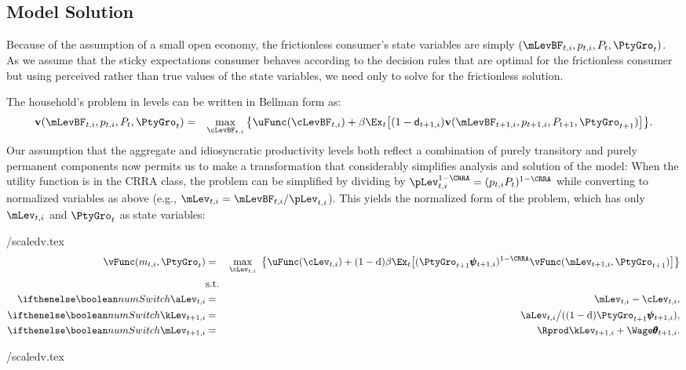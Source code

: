 \documentclass[titlepage]{\econtex}
\let\footnote=\endnote
\begin{document}
\subsection{Model Solution}

Because of the assumption of a small open economy, the frictionless consumer's state variables are simply $(\mLevBF_{t,i},p_{t,i},P_t,\PtyGro_t)$.  As we assume that the sticky expectations consumer behaves according to the decision rules that are optimal for the frictionless consumer but using perceived rather than true values of the state variables, we need only to solve for the frictionless solution.

The household's problem in levels can be written in Bellman form as:\footnote{Subject to definitions \eqref{eq:AggRandWalk}, \eqref{eq:IndRandWalk}, \eqref{eq:ell}, \eqref{eq:mDef}, \eqref{eq:aDef} and \eqref{eq:ktp1icompact}.}
\begin{eqnarray*}
\textbf{v}(\mLevBF_{t,i},p_{t,i},P_t,\PtyGro_t)  & = &  \max_{\cLevBF_{t,i}}  \big\{ \uFunc(\cLevBF_{t,i}) + \beta \Ex_t \big[(1-\pDies_{t+1,i})\textbf{v}(\mLevBF_{t+1,i},p_{t+1,i},P_{t+1},\PtyGro_{t+1})\big] \big\}. \nonumber
\end{eqnarray*}
Our assumption that the aggregate and idiosyncratic productivity levels both reflect a combination of purely transitory and purely permanent components now permits us to make a transformation that considerably simplifies analysis and solution of the model: When the utility function is in the CRRA class, the problem can be simplified by dividing by $\pLev_{t,i}^{1-\CRRA} = (p_{t,i}P_t)^{1-\CRRA}$ while converting to normalized variables as above (e.g., $\mLev_{t,i}=\mLevBF_{t,i}/\pLev_{t,i}$). %
This yields the normalized form of the problem, which has only $\mLev_{t,i}$ and $\PtyGro_t$ as state variables:
\begin{verbatimwrite}{\eq/scaledv.tex}
\begin{eqnarray}
    \vFunc({m}_{t,i},\PtyGro_t) & = & \max_{\cLev_{t,i}} ~ \big\{ \uFunc(\cLev_{t,i}) + \PLives \beta
    \Ex_{t}\big[ (\PtyGro_{t+1} \pmb{\psi}_{t+1,i})^{1-\CRRA}\vFunc(\mLev_{t+1,i},\PtyGro_{t+1})\big] \big\}
    \label{eq:scaledv}
\\  & \mbox{s.t.} & \nonumber
\\ \ifnumSw  \aLev_{t,i}   & = & \mLev_{t,i} - \cLev_{t,i}, \nonumber
\\ \ifnumSw  \kLev_{t+1,i} & = & \aLev_{t,i} \big/( \PLives \PtyGro_{t+1} \pmb{\psi}_{t+1,i} ),  \nonumber
\\ \ifnumSw  \mLev_{t+1,i} & = & \Rprod \kLev_{t+1,i} + \Wage \pmb{\theta}_{t+1,i}.  \nonumber
\end{eqnarray}
\end{verbatimwrite}
 \eq/scaledv.tex
\end{document}
